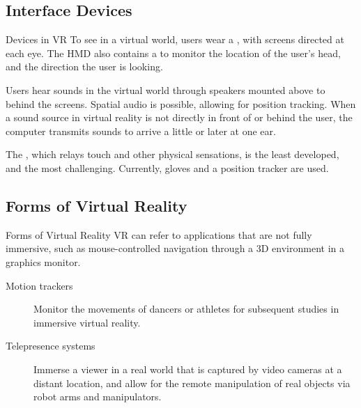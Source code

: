 \documentclass[\main/notes.tex]{subfiles}
\begin{document}
			\subsection{Interface Devices}
				\begin{sidenote}{Devices in VR}
					To see in a virtual world, users wear a , with screens directed at each eye. The HMD also contains a  to monitor the location of the user's head, and the direction the user is looking.

					Users hear sounds in the virtual world through speakers mounted above to behind the screens. Spatial audio is possible, allowing for position tracking. When a sound source in virtual reality is not directly in front of or behind the user, the computer transmits sounds to arrive a little or later at one ear.

					The , which relays touch and other physical sensations, is the least developed, and the most challenging. Currently, gloves and a position tracker are used.
				\end{sidenote}
			\subsection{Forms of Virtual Reality}
				\begin{sidenote}{Forms of Virtual Reality}
					VR can refer to applications that are not fully immersive, such as mouse-controlled navigation through a 3D environment in a graphics monitor.
					\begin{description}
						\item[Motion trackers] Monitor the movements of dancers or athletes for subsequent studies in immersive virtual reality.
						\item[Telepresence systems] Immerse a viewer in a real world that is captured by video cameras at a distant location, and allow for the remote manipulation of real objects via robot arms and manipulators.
					\end{description}
				\end{sidenote}

	\vbox{}
\end{document}

